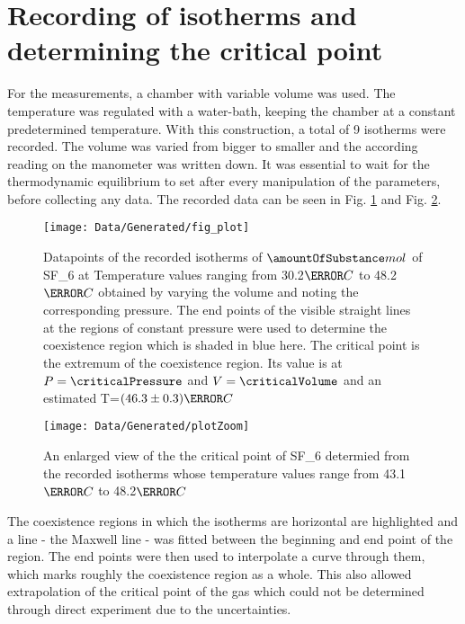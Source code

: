 \documentclass[a4paper,10pt,twocolumn]{article}
\begin{document}
    \section{Recording of isotherms and determining the critical point}\label{sec:Measurement}
    For the measurements, a chamber with variable volume was used.
    The temperature was regulated with a water-bath, keeping the chamber at a constant predetermined temperature.
    With this construction, a total of 9 isotherms were recorded. 
    The volume was varied from bigger to smaller and the according reading on the manometer was written down.
    It was essential to wait for the thermodynamic equilibrium to set after every manipulation of the parameters, before collecting any data.
    The recorded data can be seen in Fig. \ref{fig:binodal} and Fig. \ref{fig:binodalZoom}.
    \begin{figure}
        \begin{center}
            \texttt{[image: Data/Generated/fig\_plot]}\label{fig:binodal}
            \caption[]{Datapoints of the recorded isotherms of $\amountOfSubstance mol$ of SF_6\) at Temperature values ranging from 30.2$\degree C$ to 48.2$\degree C$ obtained by varying the volume and noting the corresponding pressure. The end points of the visible straight lines at the regions of constant pressure were
            used to determine the coexistence region which is shaded in blue here. The critical point is the extremum of the coexistence region. Its value is at $P=\criticalPressure$ and $V=\criticalVolume$ and an estimated
            T=$(46.3\pm0.3)\degree C$}
        \end{center}
    \end{figure}
    \begin{figure}
        \begin{center}
            \texttt{[image: Data/Generated/plotZoom]}\label{fig:binodalZoom}
            \caption[]{An enlarged view of the the critical point of SF_6\) determied from the recorded isotherms whose temperature values range from 43.1$\degree C$ to 48.2$\degree C$}
        \end{center}
        \end{figure}
    The coexistence regions in which the isotherms are horizontal are highlighted and a line - the Maxwell line - was fitted between the beginning and end point of the region.
    The end points were then used to interpolate a curve through them, which marks roughly the coexistence region as a whole.
    This also allowed extrapolation of the critical point of the gas which could not be determined through direct experiment due to the uncertainties.
\end{document}
